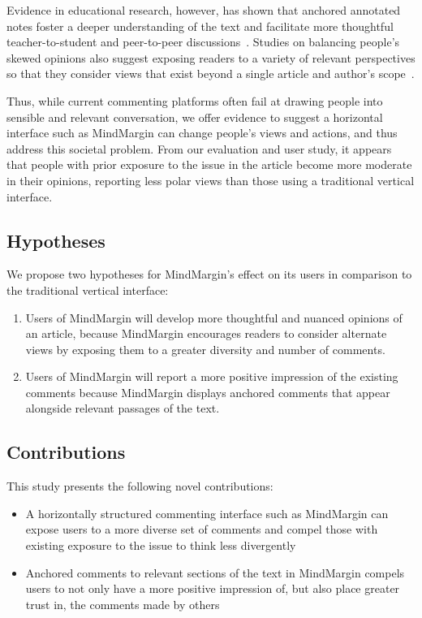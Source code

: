 Evidence in educational research, however, has shown that anchored annotated notes foster a deeper understanding of the text and facilitate more thoughtful teacher-to-student and peer-to-peer discussions~\cite{AnnotationsStudents,NB}. Studies on balancing people’s skewed opinions also suggest exposing readers to a variety of relevant perspectives so that they consider views that exist beyond a single article and author’s scope~\cite{ConsiderIt,Politics,NewsCube}. 

Thus, while current commenting platforms often fail at drawing people into sensible and relevant conversation, we offer evidence to suggest a horizontal interface such as MindMargin can change people’s views and actions, and thus address this societal problem. From our evaluation and user study, it appears that people with prior exposure to the issue in the article become more moderate in their opinions, reporting less polar views than those using a traditional vertical interface.

\subsection{Hypotheses}
We propose two hypotheses for MindMargin's effect on its users in comparison to the traditional vertical interface:
\begin{enumerate}
\item Users of MindMargin will develop more thoughtful and nuanced opinions of an article, because MindMargin encourages readers to consider alternate views by exposing them to a greater diversity and number of comments.
\item Users of MindMargin will report a more positive impression of the existing comments because MindMargin displays anchored comments that appear alongside relevant passages of the text.
\end{enumerate}

\subsection{Contributions}
This study presents the following novel contributions:
\begin{itemize}
\item A horizontally structured commenting interface such as MindMargin can expose users to a more diverse set of comments and compel those with existing exposure to the issue to think less divergently
\item Anchored comments to relevant sections of the text in MindMargin compels users to not only have a more positive impression of, but also place greater trust in, the comments made by others
\end{itemize}

